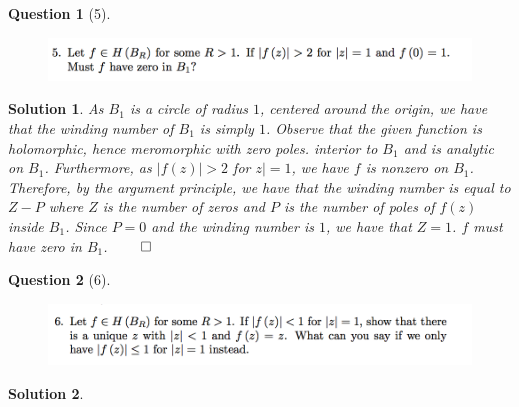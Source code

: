 \documentclass{article} %
\theoremstyle{quest}
\newtheorem*{question}{Question}
\newtheorem*{solution}{Solution}
\begin{document}
\bigskip

\begin{question}[5]
\hfill
\begin{figure}[h!]
\centering
\includegraphics[width=1\textwidth]{cv-9-5}
\end{figure}
\end{question}
\begin{solution}
As $B_1$ is a circle of radius $1$, centered around the origin,
we have that the winding number of $B_1$ is simply $1$. Observe that
the given function is holomorphic, hence meromorphic with zero poles.
interior to $B_1$ and is analytic on $B_1$. Furthermore, as $|f(z)| > 2$
for $z| = 1$, we have $f$ is nonzero on $B_1$. Therefore, by the argument
principle, we have that the winding number is equal to $Z - P$ where
$Z$ is the number of zeros and $P$ is the number of poles of $f(z)$
inside $B_1$. Since $P = 0$ and the winding number is $1$,
 we have that $Z = 1$. $f$ must have zero in $B_1$.
 \hfill $\qed$
\end{solution}

\bigskip

\begin{question}[6]
\hfill
\begin{figure}[h!]
\centering
\includegraphics[width=1\textwidth]{cv-9-6}
\end{figure}
\end{question}
\begin{solution}
\end{solution}

\bigskip
\end{document}
